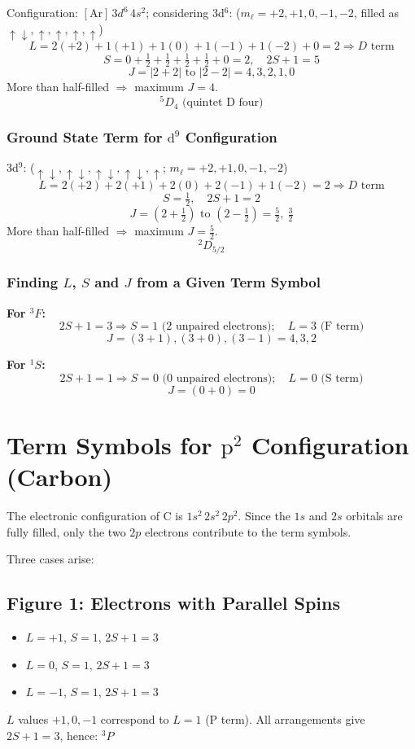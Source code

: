 \documentclass[12pt,a4paper]{article}
\begin{document}
Configuration: $[\mathrm{Ar}]\,3d^6\,4s^2$; considering 3d$^6$: ($m_\ell = +2,+1,0,-1,-2$, filled as $\uparrow\downarrow,\uparrow,\uparrow,\uparrow,\uparrow$)
\[
L = 2(+2)+1(+1)+1(0)+1(-1)+1(-2)+0 = 2 \Rightarrow D\text{ term}
\]
\[
S = 0+\tfrac{1}{2}+\tfrac{1}{2}+\tfrac{1}{2}+\tfrac{1}{2}+0 = 2, \quad 2S+1 = 5
\]
\[
J = |2+2| \text{ to } |2-2| = 4, 3, 2, 1, 0
\]
More than half-filled $\Rightarrow$ maximum $J = 4$.
\[
\boxed{{}^5D_4 \text{ (quintet D four)}}
\]

\subsubsection{Ground State Term for $\mathrm{d}^9$ Configuration}

3d$^9$: ($\uparrow\downarrow,\uparrow\downarrow,\uparrow\downarrow,\uparrow\downarrow,\uparrow$; $m_\ell = +2,+1,0,-1,-2$)
\[
L = 2(+2)+2(+1)+2(0)+2(-1)+1(-2) = 2 \Rightarrow D\text{ term}
\]
\[
S = \tfrac{1}{2}, \quad 2S+1 = 2
\]
\[
J = \left(2+\tfrac{1}{2}\right) \text{ to } \left(2-\tfrac{1}{2}\right) = \tfrac{5}{2},\ \tfrac{3}{2}
\]
More than half-filled $\Rightarrow$ maximum $J = \tfrac{5}{2}$.
\[
\boxed{{}^2D_{5/2}}
\]

\subsubsection{Finding $L$, $S$ and $J$ from a Given Term Symbol}

\textbf{For ${}^3F$:}
\[
2S+1 = 3 \Rightarrow S = 1 \text{ (2 unpaired electrons)}; \quad L = 3 \text{ (F term)}
\]
\[
J = (3+1),(3+0),(3-1) = 4, 3, 2
\]

\textbf{For ${}^1S$:}
\[
2S+1 = 1 \Rightarrow S = 0 \text{ (0 unpaired electrons)}; \quad L = 0 \text{ (S term)}
\]
\[
J = (0+0) = 0
\]

\section{Term Symbols for $\mathrm{p}^2$ Configuration (Carbon)}

The electronic configuration of C is $1s^2\,2s^2\,2p^2$. Since the $1s$ and $2s$ orbitals are fully filled, only the two $2p$ electrons contribute to the term symbols.

Three cases arise:

\subsection*{Figure 1: Electrons with Parallel Spins}
\begin{itemize}
  \item[(a)] $L = +1$, $S = 1$, $2S+1 = 3$
  \item[(b)] $L = 0$, $S = 1$, $2S+1 = 3$
  \item[(c)] $L = -1$, $S = 1$, $2S+1 = 3$
\end{itemize}
$L$ values $+1, 0, -1$ correspond to $L=1$ (P term). All arrangements give $2S+1=3$, hence: ${}^3P$
\end{document}
